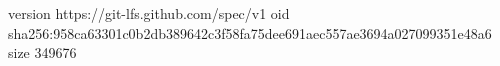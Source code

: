 version https://git-lfs.github.com/spec/v1
oid sha256:958ca63301c0b2db389642c3f58fa75dee691aec557ae3694a027099351e48a6
size 349676
